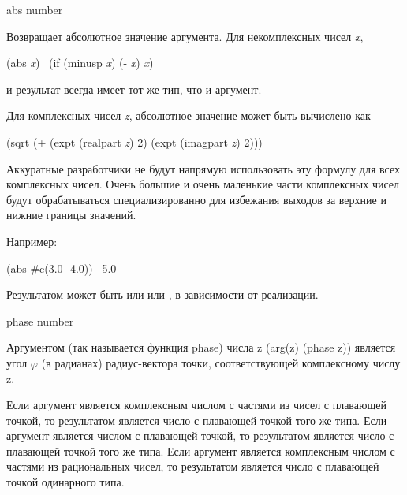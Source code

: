 \begin{defun}[Функция]
abs number

Возвращает абсолютное значение аргумента. Для некомплексных чисел \emph{x}, 
\begin{lisp}
(abs \emph{x}) \EQ\ (if (minusp \emph{x}) (- \emph{x}) \emph{x})
\end{lisp}
и результат всегда имеет тот же тип, что и аргумент.

Для комплексных чисел \emph{z}, абсолютное значение может быть вычислено как
\begin{lisp}
(sqrt (+ (expt (realpart \emph{z}) 2) (expt (imagpart \emph{z}) 2)))
\end{lisp}

\beforenoterule
\begin{implementation}
Аккуратные разработчики не будут напрямую использовать эту формулу для всех
комплексных чисел. Очень большие и очень маленькие части комплексных чисел будут
обрабатываться специализированно для избежания выходов за верхние и нижние
границы значений.
\end{implementation}
\afternoterule

Например:
\begin{lisp}
(abs \#c(3.0 -4.0)) \EV\ 5.0
\end{lisp}
Результатом  может быть или  или , в зависимости
от реализации.
\end{defun}

\begin{defun}[Функция]
phase number

Аргументом (так называется функция phase) числа z (arg(z) \EQ (phase z))
является угол $\varphi$ (в радианах) радиус-вектора точки, соответствующей
комплексному числу z.

Если аргумент является комплексным числом с частями из чисел с плавающей точкой,
то результатом является число с плавающей точкой того же типа.
Если аргумент является числом с плавающей точкой,
то результатом является число с плавающей точкой того же типа.
Если аргумент является комплексным числом с частями из рациональных чисел,
то результатом является число с плавающей точкой одинарного типа.
\end{defun}

